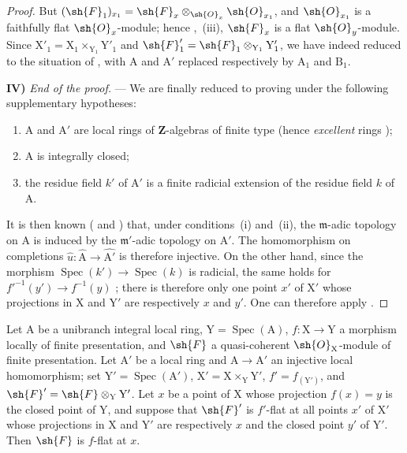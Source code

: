 \begin{proof}
But $(\sh{F}_1)_{x_1}=\sh{F}_x\otimes_{\sh{O}_x}\sh{O}_{x_1}$, and $\sh{O}_{x_1}$ is a faithfully flat $\sh{O}_x$-module; hence ,~(iii), $\sh{F}_x$ is a flat $\sh{O}_y$-module.
Since $\mathrm{X}'_1=\mathrm{X}_1\times_{\mathrm{Y}_1}\mathrm{Y}'_1$ and $\sh{F}'_1=\sh{F}_1\otimes_{\mathrm{Y}_1}\mathrm{Y}'_1$, we have indeed reduced to the situation of , with $\mathrm{A}$ and $\mathrm{A}'$ replaced respectively by $\mathrm{A}_1$ and $\mathrm{B}_1$.

\medskip
\noindent\textbf{IV)} \emph{End of the proof.} --- We are finally reduced to proving  under the following supplementary hypotheses:
\begin{enumerate}[label=(\roman*)]
  \item $\mathrm{A}$ and $\mathrm{A}'$ are local rings of $\mathbf{Z}$-algebras of finite type (hence \emph{excellent} rings );
  \item $\mathrm{A}$ is integrally closed;
  \item the residue field $k'$ of $\mathrm{A}'$ is a finite radicial extension of the residue field $k$ of $\mathrm{A}$.
\end{enumerate}
It is then known ( and ) that, under conditions~(i) and~(ii), the $\mathfrak{m}$-adic topology on $\mathrm{A}$ is induced by the $\mathfrak{m}'$-adic topology on $\mathrm{A}'$.
The homomorphism on completions $\widehat{u}:\widehat{\mathrm{A}}\to\widehat{\mathrm{A}'}$ is therefore injective.
On the other hand, since the morphism $\operatorname{Spec}(k')\to\operatorname{Spec}(k)$ is radicial, the same holds for $f'^{-1}(y')\to f^{-1}(y)$ ; there is therefore only one point $x'$ of $\mathrm{X}'$ whose projections in $\mathrm{X}$ and $\mathrm{Y}'$ are respectively $x$ and $y'$.
One can therefore apply .
\end{proof}

\begin{corollary}[11.6.2]
\label{IV.11.6.2}
Let $\mathrm{A}$ be a unibranch integral local ring, $\mathrm{Y}=\operatorname{Spec}(\mathrm{A})$, $f:\mathrm{X}\to\mathrm{Y}$ a morphism locally of finite presentation, and $\sh{F}$ a quasi-coherent $\sh{O}_\mathrm{X}$-module of finite presentation.
Let $\mathrm{A}'$ be a local ring and $\mathrm{A}\to\mathrm{A}'$ an injective local homomorphism; set $\mathrm{Y}'=\operatorname{Spec}(\mathrm{A}')$, $\mathrm{X}'=\mathrm{X}\times_\mathrm{Y}\mathrm{Y}'$, $f'=f_{(\mathrm{Y}')}$, and $\sh{F}'=\sh{F}\otimes_\mathrm{Y}\mathrm{Y}'$.
Let $x$ be a point of $\mathrm{X}$ whose projection $f(x)=y$ is the closed point of $\mathrm{Y}$, and suppose that $\sh{F}'$ is $f'$-flat at all points $x'$ of $\mathrm{X}'$ whose projections in $\mathrm{X}$ and $\mathrm{Y}'$ are respectively $x$ and the closed point $y'$ of $\mathrm{Y}'$.
Then $\sh{F}$ is $f$-flat at $x$.
\end{corollary}

